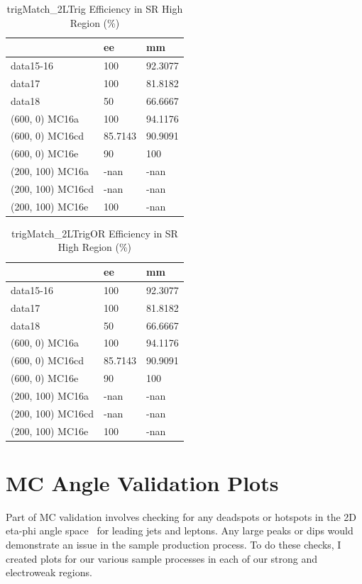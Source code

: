 \begin{table}
\begin{center}
\caption{trigMatch\_2LTrig Efficiency in SR High Region (\%)}
\begin{tabular}{l|l|l}
& ee & mm \\
\hline
data15-16 & 100 & 92.3077 \\
data17 & 100 & 81.8182 \\
data18 & 50 & 66.6667 \\
(600, 0) MC16a & 100 & 94.1176 \\
(600, 0) MC16cd & 85.7143 & 90.9091 \\
(600, 0) MC16e & 90 & 100 \\
(200, 100) MC16a & -nan & -nan \\
(200, 100) MC16cd & -nan & -nan \\
(200, 100) MC16e & 100 & -nan \\
\end{tabular}
\end{center}
\end{table}

\begin{table}
\begin{center}
\caption{trigMatch\_2LTrigOR Efficiency in SR High Region (\%)}
\begin{tabular}{l|l|l}
& ee & mm \\
\hline
data15-16 & 100 & 92.3077 \\
data17 & 100 & 81.8182 \\
data18 & 50 & 66.6667 \\
(600, 0) MC16a & 100 & 94.1176 \\
(600, 0) MC16cd & 85.7143 & 90.9091 \\
(600, 0) MC16e & 90 & 100 \\
(200, 100) MC16a & -nan & -nan \\
(200, 100) MC16cd & -nan & -nan \\
(200, 100) MC16e & 100 & -nan
\label{tab:trigger_last}
\end{tabular}
\end{center}
\end{table}

\section{MC Angle Validation Plots}

Part of MC validation involves checking for any deadspots or hotspots in the 2D eta-phi angle space~\cite{twiki_checks} for leading jets and leptons. Any large peaks or dips would demonstrate an issue in the sample production process. To do these checks, I created plots for our various sample processes in each of our strong and electroweak regions.

